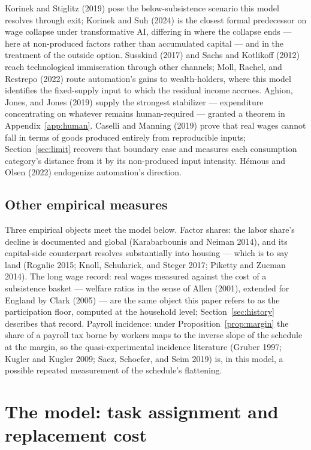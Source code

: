 \documentclass[12pt]{article}
\theoremstyle{plain}
\begin{document}
Korinek and Stiglitz (2019) pose the below-subsistence scenario this model resolves through exit; Korinek and Suh (2024) is the closest formal predecessor on wage collapse under transformative AI, differing in where the collapse ends --- here at non-produced factors rather than accumulated capital --- and in the treatment of the outside option. Susskind (2017) and Sachs and Kotlikoff (2012) reach technological immiseration through other channels; Moll, Rachel, and Restrepo (2022) route automation's gains to wealth-holders, where this model identifies the fixed-supply input to which the residual income accrues. Aghion, Jones, and Jones (2019) supply the strongest stabilizer --- expenditure concentrating on whatever remains human-required --- granted a theorem in Appendix~\ref{app:human}. Caselli and Manning (2019) prove that real wages cannot fall in terms of goods produced entirely from reproducible inputs; Section~\ref{sec:limit} recovers that boundary case and measures each consumption category's distance from it by its non-produced input intensity. Hémous and Olsen (2022) endogenize automation's direction.

\subsection{Other empirical measures}\label{sec:data}

Three empirical objects meet the model below. Factor shares: the labor share's decline is documented and global (Karabarbounis and Neiman 2014), and its capital-side counterpart resolves substantially into housing --- which is to say land (Rognlie 2015; Knoll, Schularick, and Steger 2017; Piketty and Zucman 2014). The long wage record: real wages measured against the cost of a subsistence basket --- welfare ratios in the sense of Allen (2001), extended for England by Clark (2005) --- are the same object this paper refers to as the participation floor, computed at the household level; Section~\ref{sec:history} describes that record. Payroll incidence: under Proposition~\ref{prop:margin} the share of a payroll tax borne by workers maps to the inverse slope of the schedule at the margin, so the quasi-experimental incidence literature (Gruber 1997; Kugler and Kugler 2009; Saez, Schoefer, and Seim 2019) is, in this model, a possible repeated measurement of the schedule's flattening.

\section{The model: task assignment and replacement cost}\label{sec:model}
\end{document}
